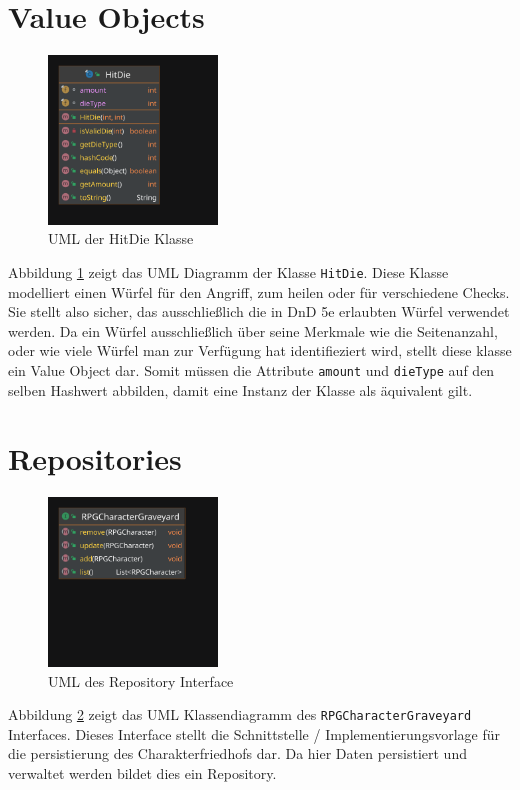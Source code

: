 \section{Value Objects}
\begin{figure}[H]
	\centering
	\includegraphics[width=0.4\textwidth]{Bilder/HitDie.pdf}
	\caption{UML der HitDie Klasse}
	\label{fig:HitDie}
\end{figure}
Abbildung \ref{fig:HitDie} zeigt das UML Diagramm der Klasse \texttt{HitDie}. Diese Klasse modelliert einen Würfel für den Angriff, zum heilen oder für verschiedene Checks. Sie stellt also sicher, das ausschließlich die in DnD 5e erlaubten Würfel verwendet werden. Da ein Würfel ausschließlich über seine Merkmale wie die Seitenanzahl, oder wie viele Würfel man zur Verfügung hat identifieziert wird, stellt diese klasse ein Value Object dar. Somit müssen die Attribute \texttt{amount} und \texttt{dieType} auf den selben Hashwert abbilden, damit eine Instanz der Klasse als äquivalent gilt.

\section{Repositories}
\begin{figure}[H]
	\centering
	\includegraphics[width=0.4\textwidth]{Bilder/RPGCharacterGraveyard.pdf}
	\caption{UML des Repository Interface}
	\label{fig:Repository}
\end{figure}
Abbildung \ref{fig:Repository} zeigt das UML Klassendiagramm des \texttt{RPGCharacterGraveyard} Interfaces. Dieses Interface stellt die Schnittstelle / Implementierungsvorlage für die persistierung des Charakterfriedhofs dar. Da hier Daten persistiert und verwaltet werden bildet dies ein Repository.

